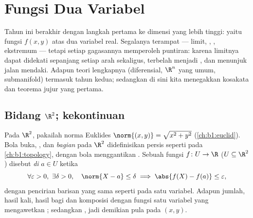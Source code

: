 \chapter{Fungsi Dua Variabel}\label{ch:b1:multivar}

Tahun ini berakhir dengan langkah pertama ke dimensi yang lebih tinggi: yaitu fungsi
$f(x, y)$ atas dua variabel real. Segalanya terampat --- limit,
, , ekstremum --- tetapi setiap gagasannya memperoleh puntiran:
karena limitnya dapat didekati sepanjang setiap arah sekaligus, 
terbelah menjadi , dan  menunjuk jalan mendaki. Adapun
teori lengkapnya (diferensial, $\R^n$ yang umum, submanifold) termasuk
tahun kedua; sedangkan di sini kita menegakkan kosakata dan teorema
jujur yang pertama.

\section{Bidang $\R^2$; kekontinuan}

\begin{definition}\label{def:b1:multivar:topology}
Pada $\R^2$, pakailah norma Euklides $\norm{(x,y)} = \sqrt{x^2 + y^2}$
(\cref{ch:b1:euclid}). Bola buka, , dan \emph{ bagian
} pada $\R^2$ didefinisikan persis seperti pada
\cref{ch:b1:topology}, dengan bola menggantikan . Sebuah fungsi
$f \colon U \to \R$ ($U \subseteq \R^2$ ) disebut \emph{
di} $a \in U$ ketika
\[
\forall\varepsilon > 0,\ \exists\delta > 0, \quad
\norm{X - a} \leq \delta \implies \abs{f(X) - f(a)} \leq
\varepsilon,
\]
dengan pencirian barisan yang sama seperti pada satu variabel.
Adapun jumlah, hasil kali, hasil bagi dan komposisi dengan fungsi
satu variabel yang  mengawetkan ; sedangkan  
, jadi demikian pula  pada $(x,y)$.
\end{definition}


